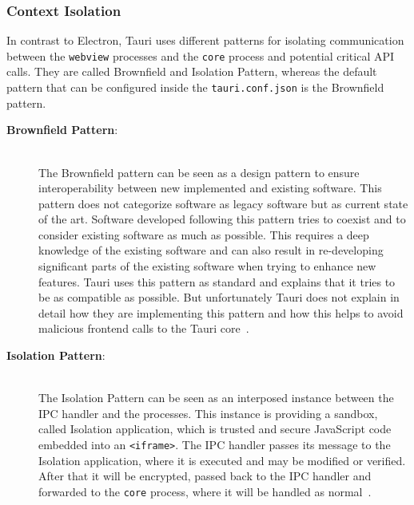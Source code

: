 \subsubsection{Context Isolation}
In contrast to Electron, Tauri uses different patterns for isolating communication between the \texttt{webview} processes and the \texttt{core} process and potential critical \ac{API} calls.
They are called Brownfield and Isolation Pattern, whereas the default pattern that can be configured inside the \texttt{tauri.conf.json} is the Brownfield pattern.
\begin{description}
    \item[\textbf{Brownfield Pattern}:] \hfill \\
    The Brownfield pattern can be seen as a design pattern to ensure interoperability between new implemented and existing software.
    This pattern does not categorize software as legacy software but as current state of the art.
    Software developed following this pattern tries to coexist and to consider existing software as much as possible.
    This requires a deep knowledge of the existing software and can also result in re-developing significant parts of the existing software when trying to enhance new features.
    Tauri uses this pattern as standard and explains that it tries to be as compatible as possible.
    But unfortunately Tauri does not explain in detail how they are implementing this pattern and how this helps to avoid malicious frontend calls to the Tauri core~\cite{tauri}. \\
    \item[\textbf{Isolation Pattern}:] \hfill \\
    The Isolation Pattern can be seen as an interposed instance between the \ac{IPC} handler and the processes.
    This instance is providing a sandbox, called Isolation application, which is trusted and secure JavaScript code embedded into an \texttt{<iframe>}.
    The \ac{IPC} handler passes its message to the Isolation application, where it is executed and may be modified or verified.
    After that it will be encrypted, passed back to the \ac{IPC} handler and forwarded to the \texttt{core} process, where it will be handled as normal~\cite{tauri}.


\end{description}

